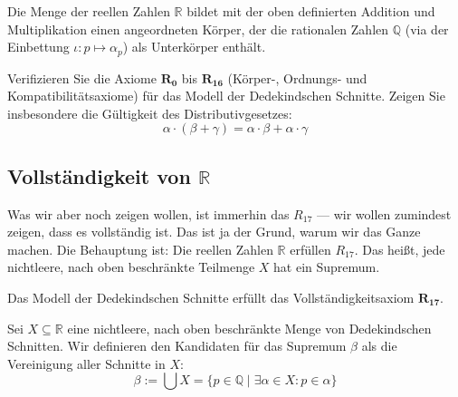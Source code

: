 \begin{math-stroke}
\begin{theorem}\label{thm:reelle-zahlen-koerper}
Die Menge der reellen Zahlen $\mathbb{R}$ bildet mit der oben definierten Addition und Multiplikation einen angeordneten Körper, der die rationalen Zahlen $\mathbb{Q}$ (via der Einbettung $\iota \colon p \mapsto \alpha_p$) als Unterkörper enthält.
\end{theorem}

\begin{exercise}
Verifizieren Sie die Axiome $\mathbf{R_0}$ bis $\mathbf{R_{16}}$ (Körper-, Ordnungs- und Kompatibilitätsaxiome) für das Modell der Dedekindschen Schnitte. Zeigen Sie insbesondere die Gültigkeit des Distributivgesetzes:
\[ \alpha \cdot (\beta + \gamma) = \alpha \cdot \beta + \alpha \cdot \gamma \]
\end{exercise}
\end{math-stroke}

\subsection{Vollständigkeit von \texorpdfstring{$\mathbb{R}$}{R}}

\begin{spoken-clean}[01:12:45 - 01:15:30]
Was wir aber noch zeigen wollen, ist immerhin das $R_{17}$ --- wir wollen zumindest zeigen, dass es vollständig ist. Das ist ja der Grund, warum wir das Ganze machen. Die Behauptung ist: Die reellen Zahlen $\mathbb{R}$ erfüllen $R_{17}$. Das heißt, jede nichtleere, nach oben beschränkte Teilmenge $X$ hat ein Supremum.
\end{spoken-clean}

\begin{math-stroke}
\begin{theorem}[Vollständigkeitssatz]\label{thm:vollstaendigkeit-reell}
Das Modell der Dedekindschen Schnitte erfüllt das Vollständigkeitsaxiom $\mathbf{R_{17}}$.
\end{theorem}

\begin{short-proof}[Beweisidee]
Sei $X \subseteq \mathbb{R}$ eine nichtleere, nach oben beschränkte Menge von Dedekindschen Schnitten. Wir definieren den Kandidaten für das Supremum $\beta$ als die Vereinigung aller Schnitte in $X$:
\begin{equation}
\label{eq:supremum-konstruktion}
\beta := \bigcup X = \{ p \in \mathbb{Q} \mid \exists \alpha \in X \colon p \in \alpha \}
\end{equation}
\end{short-proof}
\end{math-stroke}

